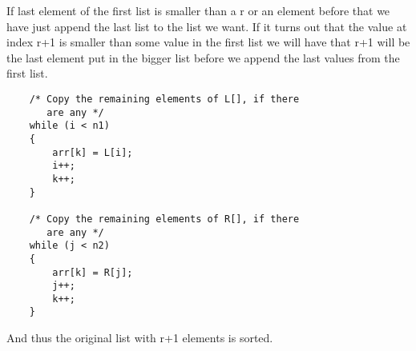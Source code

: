 If last element of the first list is smaller than a r or an element before that we have just append the last list to the list we want. If it turns out that the value at index r+1 is smaller than some value in the first list we will have that r+1 will be the last element put in the bigger list before we append the last values from the first list. 

\begin{lstlisting}
    /* Copy the remaining elements of L[], if there 
       are any */
    while (i < n1) 
    { 
        arr[k] = L[i]; 
        i++; 
        k++; 
    } 
  
    /* Copy the remaining elements of R[], if there 
       are any */
    while (j < n2) 
    { 
        arr[k] = R[j]; 
        j++; 
        k++; 
    } 
\end{lstlisting}
And thus the original list with r+1 elements is sorted. 

